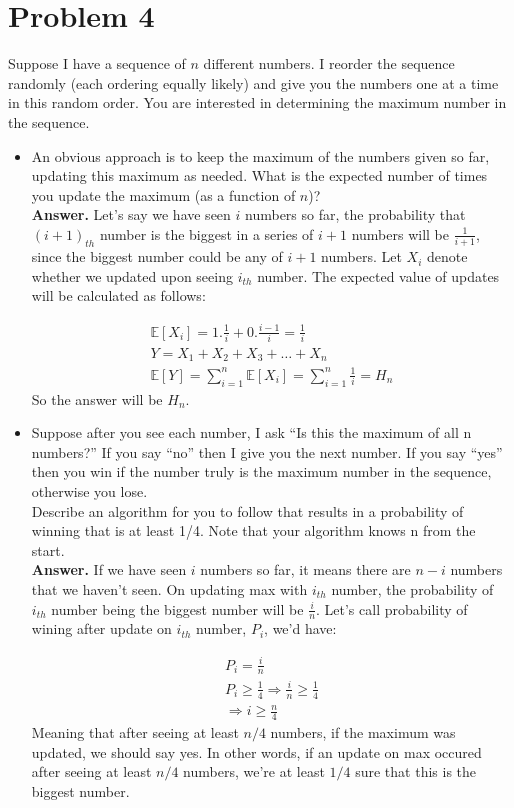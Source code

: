 \documentclass[11pt]{article} %
\begin{document}
\section*{Problem 4}
Suppose I have a sequence of $n$ different numbers. I reorder the sequence randomly (each ordering equally likely) and give you the numbers one at a time in this random order. You are interested in determining the maximum number in the sequence.

\begin{itemize}
	\item An obvious approach is to keep the maximum of the numbers given so far, updating this maximum as needed. What is the expected number of times you update the maximum (as a function of $n$)?\\
\textbf{Answer.} Let's say we have seen $i$ numbers so far, the probability that $(i+1)_{th}$ number is the biggest in a series of $i+1$ numbers will be $\frac{1}{i+1}$, since the biggest number could be any of $i+1$ numbers. Let $X_i$ denote whether we updated upon seeing $i_{th}$ number. The expected value of updates will be calculated as follows:

\begin{gather}
\mathbb{E}[X_i] = 1.\frac{1}{i}+0.\frac{i-1}{i}=\frac{1}{i}\\
Y = X_1+X_2+X_3+\ldots+X_n\\
\mathbb{E}[Y]=\sum_{i=1}^{n}\mathbb{E}[X_i] = \sum_{i=1}^{n}\frac{1}{i} = H_n
\end{gather}
So the answer will be $H_n$.

\item Suppose after you see each number, I ask ``Is this the maximum of all n numbers?'' If you say ``no'' then I give you the next number. If you say ``yes'' then you win if the number truly is the maximum number in the sequence, otherwise you lose.\\
Describe an algorithm for you to follow that results in a probability of winning that is at least 1/4. Note that your algorithm knows n from the start.\\
\textbf{Answer.} If we have seen $i$ numbers so far, it means there are $n-i$ numbers that we haven't seen. On updating max with $i_{th}$ number, the probability of $i_{th}$ number being  the biggest number will be $\frac{i}{n}$. Let's call probability of wining after update on $i_{th}$ number, $P_{i}$, we'd have:

\begin{gather}
	P_{i} = \frac{i}{n}\\
	P_i \geq \frac{1}{4} \Rightarrow \frac{i}{n} \geq \frac{1}{4}\\
	\Rightarrow i \geq \frac{n}{4}
\end{gather}
Meaning that after seeing at least $n/4$ numbers, if the maximum was updated, we should say yes. In other words, if an update on max occured after seeing at least $n/4$ numbers, we're at least $1/4$ sure that this is the biggest number.
\end{itemize}
\end{document}
